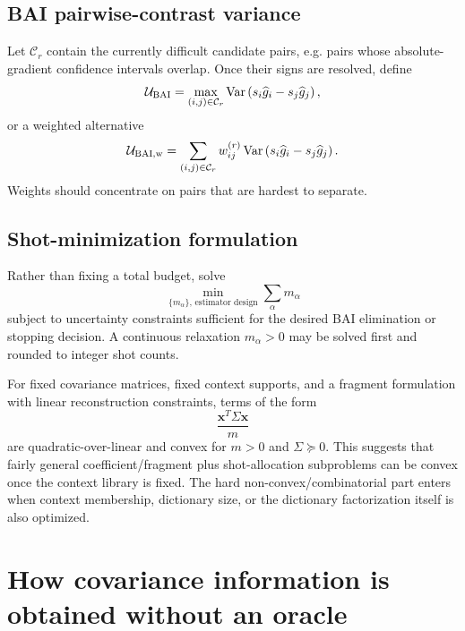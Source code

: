 \documentclass[11pt]{article}
\newcommand{\Var}{\operatorname{Var}}
\begin{document}
\subsection{BAI pairwise-contrast variance}

Let $\mathcal C_r$ contain the currently difficult candidate pairs, e.g. pairs whose absolute-gradient confidence intervals overlap.  Once their signs are resolved, define
\begin{equation}
  \mathcal U_{\rm BAI}
  =\max_{(i,j)\in\mathcal C_r}
  \Var\left(s_i\widehat g_i-s_j\widehat g_j\right),
  \label{eq:minimax-bai}
\end{equation}
or a weighted alternative
\begin{equation}
  \mathcal U_{\rm BAI,w}
  =\sum_{(i,j)\in\mathcal C_r}w_{ij}^{(r)}
  \Var\left(s_i\widehat g_i-s_j\widehat g_j\right).
  \label{eq:weighted-bai}
\end{equation}
Weights should concentrate on pairs that are hardest to separate.

\subsection{Shot-minimization formulation}

Rather than fixing a total budget, solve
\begin{equation}
  \min_{\{m_\alpha\},\,\text{estimator design}}
  \sum_\alpha m_\alpha
  \label{eq:minshots}
\end{equation}
subject to uncertainty constraints sufficient for the desired BAI elimination or stopping decision.  A continuous relaxation $m_\alpha>0$ may be solved first and rounded to integer shot counts.

For fixed covariance matrices, fixed context supports, and a fragment formulation with linear reconstruction constraints, terms of the form
\begin{equation}
  \frac{\bm x^T\Sigma\bm x}{m}
\end{equation}
are quadratic-over-linear and convex for $m>0$ and $\Sigma\succeq0$.  This suggests that fairly general coefficient/fragment plus shot-allocation subproblems can be convex once the context library is fixed.  The hard non-convex/combinatorial part enters when context membership, dictionary size, or the dictionary factorization itself is also optimized.

\section{How covariance information is obtained without an oracle}
\end{document}
